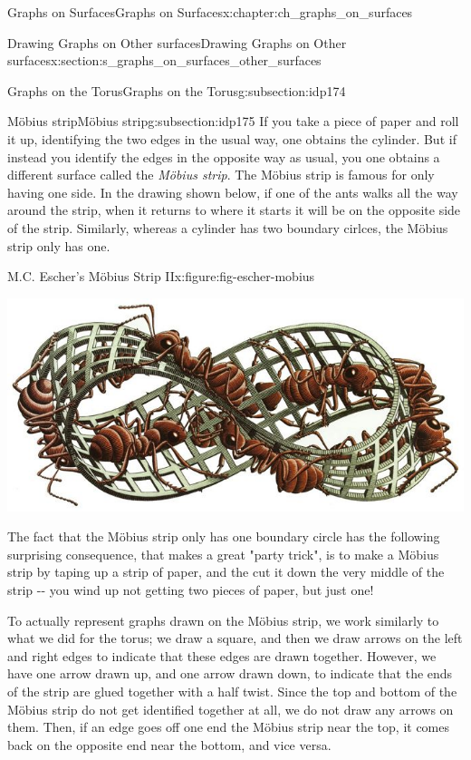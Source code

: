 \documentclass[oneside,10pt,]{book}
\numberwithin{equation}{section}
\begin{document}
\begin{chapterptx}{Graphs on Surfaces}{}{Graphs on Surfaces}{}{}{x:chapter:ch_graphs_on_surfaces}
\begin{sectionptx}{Drawing Graphs on Other surfaces}{}{Drawing Graphs on Other surfaces}{}{}{x:section:s_graphs_on_surfaces_other_surfaces}
\begin{subsectionptx}{Graphs on the Torus}{}{Graphs on the Torus}{}{}{g:subsection:idp174}
\end{subsectionptx}
%
%
\typeout{************************************************}
\typeout{************************************************}
%
\begin{subsectionptx}{Möbius strip}{}{Möbius strip}{}{}{g:subsection:idp175}
If you take a piece of paper and roll it up, identifying the two edges in the usual way, one obtains the cylinder.  But if instead you identify the edges in the opposite way as usual, you one obtains a different surface called the \emph{Möbius strip}.  The Möbius strip is famous for only having one side.  In the drawing shown below, if one of the ants walks all the way around the strip, when it returns to where it starts it will be on the opposite side of the strip.  Similarly, whereas a cylinder has two boundary cirlces, the Möbius strip only has one.%
\begin{figureptx}{M.C. Escher's Möbius Strip II}{x:figure:fig-escher-mobius}{}%
\begin{image}{0.05}{0.9}{0.05}%
\includegraphics[width=\linewidth]{images/EscherMobius.jpg}
\end{image}%
\tcblower
\end{figureptx}%
The fact that the Möbius strip only has one boundary circle has the following surprising consequence, that makes a great "party trick", is to make a Möbius strip by taping up a strip of paper, and the cut it down the very middle of the strip -{}-{} you wind up not getting two pieces of paper, but just one!%
\par
To actually represent graphs drawn on the Möbius strip, we work similarly to what we did for the torus; we draw a square, and then we draw arrows on the left and right edges to indicate that these edges are drawn together.  However, we have one arrow drawn up, and one arrow drawn down, to indicate that the ends of the strip are glued together with a half twist.   Since the top and bottom of the Möbius strip do not get identified together at all, we do not draw any arrows on them.  Then, if an edge goes off one end the Möbius strip near the top, it comes back on the opposite end near the bottom, and vice versa.%

\end{subsectionptx}
\end{sectionptx}
\end{chapterptx}
\end{document}
